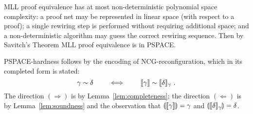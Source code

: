 \documentclass[conference]{IEEEtran}
\let\capsabbrev=\uppercase
\begin{document}
\begin{IEEEproof}
\capsabbrev{mll} proof equivalence has at most non-deterministic polynomial space complexity: a proof net may be represented in linear space (with respect to a proof); a single rewiring step is performed without requiring additional space; and a non-deterministic algorithm may guess the correct rewiring sequence.
%
Then by Savitch's Theorem \cite{Savitch-1970} \capsabbrev{mll} proof equivalence is in \capsabbrev{pspace}.


\capsabbrev{pspace}-hardness follows by the encoding of \capsabbrev{ncg}-reconfiguration, which in its completed form is stated:
\[
	\gamma\perm\delta \qquad\iff\qquad \itn\gamma\perm\itn\delta_\gamma~.
\]
%
The direction $(\Rightarrow)$ is by Lemma~\ref{lem:completeness}; the direction $(\Leftarrow)$ is by Lemma~\ref{lem:soundness} and the observation that $\llparenthesis\llbracket\gamma\rrbracket\rrparenthesis=\gamma$ and $\llparenthesis\llbracket\delta\rrbracket_\gamma\rrparenthesis=\delta$.
%
\end{IEEEproof}





\end{document}
